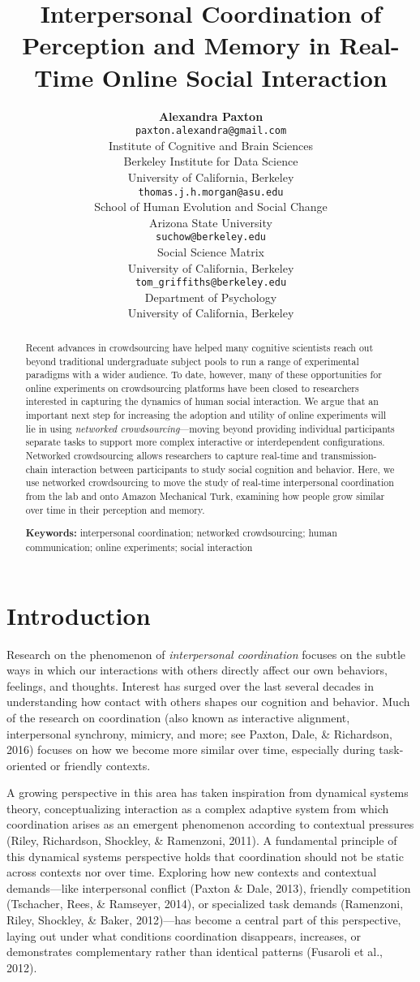 \documentclass[10pt, letterpaper]{article}
\title{Interpersonal Coordination of Perception and Memory in Real-Time Online
Social Interaction}
\author{{\large \bf Alexandra Paxton} \\ \texttt{paxton.alexandra@gmail.com} \\ Institute of Cognitive and Brain Sciences \\ Berkeley Institute for Data Science \\ University of California, Berkeley \And {\large \bf Thomas J. H. Morgan} \\ \texttt{thomas.j.h.morgan@asu.edu} \\ School of Human Evolution and Social Change \\ Arizona State University \AND {\large \bf Jordan W. Suchow} \\ \texttt{suchow@berkeley.edu} \\ Social Science Matrix \\ University of California, Berkeley \And {\large \bf Thomas L. Griffiths} \\ \texttt{tom\_griffiths@berkeley.edu} \\ Department of Psychology \\ University of California, Berkeley}
\begin{document}
\maketitle

\begin{abstract}
Recent advances in crowdsourcing have helped many cognitive scientists
reach out beyond traditional undergraduate subject pools to run a range
of experimental paradigms with a wider audience. To date, however, many
of these opportunities for online experiments on crowdsourcing platforms
have been closed to researchers interested in capturing the dynamics of
human social interaction. We argue that an important next step for
increasing the adoption and utility of online experiments will lie in
using \emph{networked crowdsourcing}---moving beyond providing
individual participants separate tasks to support more complex
interactive or interdependent configurations. Networked crowdsourcing
allows researchers to capture real-time and transmission-chain
interaction between participants to study social cognition and behavior.
Here, we use networked crowdsourcing to move the study of real-time
interpersonal coordination from the lab and onto Amazon Mechanical Turk,
examining how people grow similar over time in their perception and
memory.

\textbf{Keywords:}
interpersonal coordination; networked crowdsourcing; human
communication; online experiments; social interaction
\end{abstract}

\section{Introduction}\label{introduction}

Research on the phenomenon of \emph{interpersonal coordination} focuses
on the subtle ways in which our interactions with others directly affect
our own behaviors, feelings, and thoughts. Interest has surged over the
last several decades in understanding how contact with others shapes our
cognition and behavior. Much of the research on coordination (also known
as interactive alignment, interpersonal synchrony, mimicry, and more;
see Paxton, Dale, \& Richardson, 2016) focuses on how we become more
similar over time, especially during task-oriented or friendly contexts.

A growing perspective in this area has taken inspiration from dynamical
systems theory, conceptualizing interaction as a complex adaptive system
from which coordination arises as an emergent phenomenon according to
contextual pressures (Riley, Richardson, Shockley, \& Ramenzoni, 2011).
A fundamental principle of this dynamical systems perspective holds that
coordination should not be static across contexts nor over time.
Exploring how new contexts and contextual demands---like interpersonal
conflict (Paxton \& Dale, 2013), friendly competition (Tschacher, Rees,
\& Ramseyer, 2014), or specialized task demands (Ramenzoni, Riley,
Shockley, \& Baker, 2012)---has become a central part of this
perspective, laying out under what conditions coordination disappears,
increases, or demonstrates complementary rather than identical patterns
(Fusaroli et al., 2012).
\end{document}
